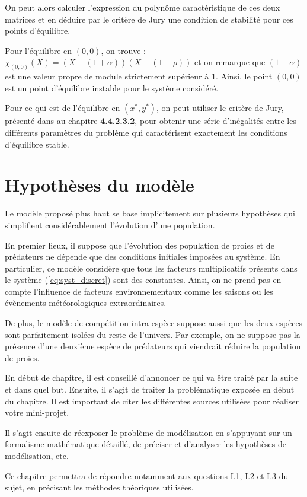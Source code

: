 On peut alors calculer l'expression du polynôme caractéristique de ces deux matrices et en déduire par le critère de Jury une condition de stabilité pour ces points d'équilibre.

Pour l'équilibre en $(0,0)$, on trouve : $\chi_{(0,0)} (X) = (X - (1 + \alpha))(X - (1 - \rho))$ et on remarque que $(1 + \alpha)$ est une valeur propre de module strictement supérieur à $1$. Ainsi, le point $(0, 0)$ est un point d'équilibre instable pour le système considéré.

Pour ce qui est de l'équilibre en $(x^*, y^*)$, on peut utiliser le critère de Jury, présenté dans \cite{Chevet22fr} au chapitre \textbf{4.4.2.3.2}, pour obtenir une série d'inégalités entre les différents paramètres du problème qui caractérisent exactement les conditions d'équilibre stable.

\section{Hypothèses du modèle}
\label{sec:Hypotheses}

Le modèle proposé plus haut se base implicitement sur plusieurs hypothèses qui simplifient considérablement l'évolution d'une population.

En premier lieux, il suppose que l'évolution des population de proies et de prédateurs ne dépende que des conditions initiales imposées au système. En particulier, ce modèle considère que tous les facteurs multiplicatifs présents dans le système (\ref{eq:syst_discret}) sont des constantes. Ainsi, on ne prend pas en compte l'influence de facteurs environnementaux comme les saisons ou les évènements météorologiques extraordinaires.

De plus, le modèle de compétition intra-espèce suppose aussi que les deux espèces sont parfaitement isolées du reste de l'univers. Par exemple, on ne suppose pas la présence d'une deuxième espèce de prédateurs qui viendrait réduire la population de proies.
\vspace{15pt}


En début de chapitre, il est conseillé d'annoncer ce qui va être traité par la suite et dans quel but. Ensuite, il s’agit de traiter la problématique exposée en début du chapitre. Il est important de citer les différentes sources utilisées pour réaliser votre mini-projet.

Il s'agit ensuite de réexposer le problème de modélisation en s’appuyant sur un formalisme mathématique détaillé, de préciser et d'analyser les hypothèses de modélisation, etc.

Ce chapitre permettra de répondre notamment aux questions I.1, I.2 et I.3 du sujet, en précisant les méthodes théoriques utilisées.